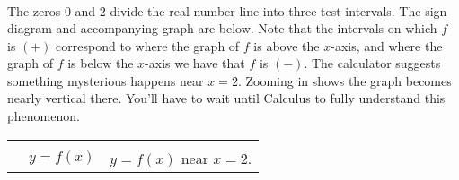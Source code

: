 \documentclass[12pt]{ximera}
\begin{document}
\begin{example}
\begin{enumerate}
\[\begin{array}{rclr}
\end{array}\]

The zeros $0$ and $2$ divide the real number line into three test intervals.  The sign diagram and accompanying graph are below.  Note that the intervals on which $f$ is $(+)$ correspond to where the graph of $f$ is above the $x$-axis, and where the graph of $f$ is below the $x$-axis we have that $f$ is $(-)$.  The calculator suggests something mysterious happens near $x=2$.  Zooming in shows the graph becomes nearly vertical there.  You'll have to wait until Calculus to fully understand this phenomenon.

\begin{tabular}{m{2in}cc}













& 


&

 \\ 

& $y=f(x)$ & $y=f(x)$ near $x=2$.

\end{tabular}


\end{enumerate}
\end{example}
\end{document}
